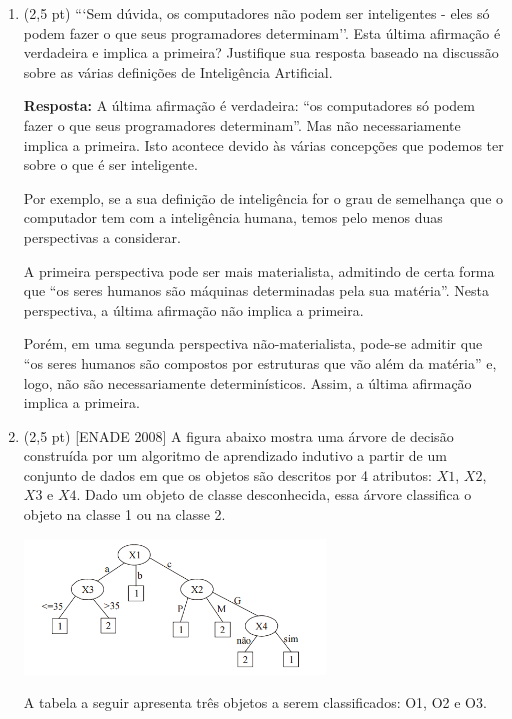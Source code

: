 \documentclass[12pt,a4paper,oneside]{article}
\begin{document}
\begin{enumerate}

	\item (2,5 pt) ```Sem dúvida, os computadores não podem ser inteligentes - eles só podem fazer o que seus programadores determinam''. Esta última afirmação é verdadeira e implica a primeira? Justifique sua resposta baseado na discussão sobre as várias definições de Inteligência Artificial.
	
	{\color{blue} 
		{\bf Resposta:} A última afirmação é verdadeira: ``os computadores só podem fazer o que seus programadores determinam''. Mas não necessariamente implica a primeira. Isto acontece devido às várias concepções que podemos ter sobre o que é ser inteligente.
		
		Por exemplo, se a sua definição de inteligência for o grau de semelhança que o computador tem com a inteligência humana, temos pelo menos duas perspectivas a considerar. 
		
		A primeira perspectiva pode ser mais materialista, admitindo de certa forma que ``os seres humanos são máquinas determinadas pela sua matéria''. Nesta perspectiva, a última afirmação não implica a primeira.
		
		Porém, em uma segunda perspectiva não-materialista, pode-se admitir que ``os seres humanos são compostos por estruturas que vão além da matéria'' e, logo, não são necessariamente determinísticos. Assim, a última afirmação implica a primeira.
	}
	 	
	\item (2,5 pt) [ENADE 2008] A figura abaixo mostra uma árvore de decisão construída por um algoritmo de aprendizado indutivo a partir de um conjunto de dados em que os objetos são descritos por 4 atributos: $X1$, $X2$, $X3$ e $X4$. Dado um objeto de classe desconhecida, essa árvore classifica o objeto na classe 1 ou na classe 2. 

		\begin{center}
			\includegraphics[width=8cm]{images/enade01.png}
		\end{center}
	
		A tabela a seguir apresenta três objetos a serem classificados: O1, O2 e O3.
		

\end{enumerate}
\end{document}
